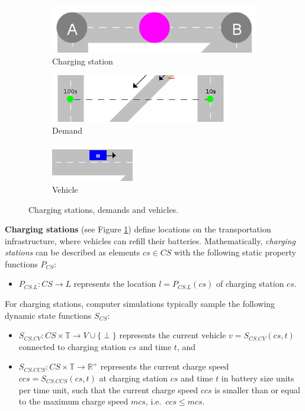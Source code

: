 \documentclass[graybox]{svmult}
\begin{document}
\begin{figure}[htbp]
	\centering
	\begin{subfigure}{.35\textwidth}
		\centering
		\includegraphics[scale=0.3]{../../concepts/charge-station.png}
		\caption{Charging station}
		\label{fig:charging-station}	
	\end{subfigure}
	\begin{subfigure}{.35\textwidth}
		\centering
		\includegraphics[scale=0.5]{../../concepts/demand.png}
		\caption{Demand}
		\label{fig:demand}
	\end{subfigure}
	\begin{subfigure}{.2\textwidth}
		\centering
		\includegraphics[scale=0.5]{../../concepts/vehicle.png}
		\caption{Vehicle}
		\label{fig:vehicle}	
	\end{subfigure}
	\caption{Charging stations, demands and vehicles.}
	\label{fig:chargingstations-demands-vehicles}	
\end{figure}

\noindent \textbf{Charging stations} (see Figure \ref{fig:charging-station}) define locations on the transportation infrastructure, where vehicles can refill their batteries.
Mathematically, \textit{charging stations} can be described as elements $cs \in CS$ with the following static property functions $P_{CS}$:
\begin{itemize}
	\item $P_{CS.L}: CS \rightarrow L$ represents the location $l = P_{CS.L}(cs)$ of charging station $cs$.
\end{itemize}
For charging stations, computer simulations typically sample the following dynamic state functions $S_{CS}$:
\begin{itemize}
	\item $S_{CS.CV}: CS \times \mathbb{T} \rightarrow V \cup \{\perp\}$ represents the current vehicle $v = S_{CS.CV}(cs, t)$ connected to charging station $cs$ and time $t$, and
	\item $S_{CS.CCS}: CS \times \mathbb{T} \rightarrow \mathbb{R}^+$ represents the current charge speed $ccs = S_{CS.CCS}(cs, t)$ at charging station $cs$ and time $t$ in battery size units per time unit, such that the current charge speed $ccs$ is smaller than or equal to the maximum charge speed $mcs$, i.e.\ $ccs \leq mcs$.
\end{itemize}
\end{document}
